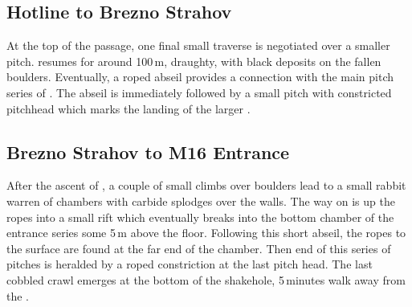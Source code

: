 \subsection{Hotline to Brezno Strahov}
At the top of the passage, one final small traverse is negotiated over a smaller pitch.  resumes for around 100\,m, draughty, with black deposits on the fallen boulders. Eventually, a roped abseil provides a connection with the main pitch series of . The abseil is immediately followed by a small pitch with constricted pitchhead which marks the landing of the larger .

\subsection{Brezno Strahov to M16 Entrance}
After the ascent of , a couple of small climbs over boulders lead to a small rabbit warren of chambers with carbide splodges over the walls. The way on is up the ropes into a small rift which eventually breaks into the bottom chamber of the entrance series some 5\,m above the floor. Following this short abseil, the ropes to the surface are found at the far end of the chamber. Then end of this series of pitches is heralded by a roped constriction at the last pitch head. The last cobbled crawl emerges at the bottom of the  shakehole, 5\,minutes walk away from the .
